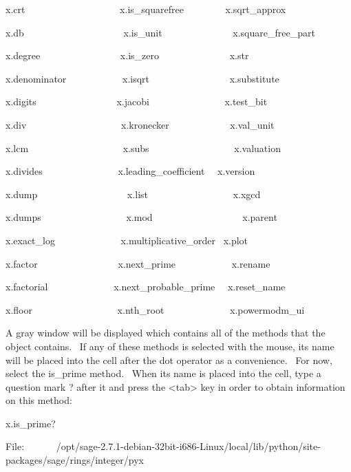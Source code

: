 \documentclass[12pt,twoside]{book}
\begin{document}
x.crt \ \ \ \ \ \ \ \ \ \ \ \ \ \ \ \ \ \ \ x.is\_squarefree
\ \ \ \ \ \ \ \ x.sqrt\_approx

x.db \ \ \ \ \ \ \ \ \ \ \ \ \ \ \ \ \ \ \ \ x.is\_unit
\ \ \ \ \ \ \ \ \ \ \ \ \ \ x.square\_free\_part

x.degree \ \ \ \ \ \ \ \ \ \ \ \ \ \ \ \ x.is\_zero
\ \ \ \ \ \ \ \ \ \ \ \ \ \ x.str

x.denominator \ \ \ \ \ \ \ \ \ \ \ x.isqrt
\ \ \ \ \ \ \ \ \ \ \ \ \ \ \ \ x.substitute

x.digits \ \ \ \ \ \ \ \ \ \ \ \ \ \ \ \ x.jacobi
\ \ \ \ \ \ \ \ \ \ \ \ \ \ \ x.test\_bit

x.div \ \ \ \ \ \ \ \ \ \ \ \ \ \ \ \ \ \ \ x.kronecker
\ \ \ \ \ \ \ \ \ \ \ \ x.val\_unit

x.lcm \ \ \ \ \ \ \ \ \ \ \ \ \ \ \ \ \ \ \ x.subs
\ \ \ \ \ \ \ \ \ \ \ \ \ \ \ \ \ x.valuation

x.divides \ \ \ \ \ \ \ \ \ \ \ \ \ \ \ x.leading\_coefficient
\ \ x.version

x.dump \ \ \ \ \ \ \ \ \ \ \ \ \ \ \ \ \ \ x.list
\ \ \ \ \ \ \ \ \ \ \ \ \ \ \ \ \ x.xgcd

x.dumps \ \ \ \ \ \ \ \ \ \ \ \ \ \ \ \ \ x.mod
\ \ \ \ \ \ \ \ \ \ \ \ \ \ \ \ \ \ x.parent

x.exact\_log \ \ \ \ \ \ \ \ \ \ \ \ \ x.multiplicative\_order \ x.plot

x.factor \ \ \ \ \ \ \ \ \ \ \ \ \ \ \ \ x.next\_prime
\ \ \ \ \ \ \ \ \ \ \ x.rename

x.factorial \ \ \ \ \ \ \ \ \ \ \ \ \ x.next\_probable\_prime
\ \ x.reset\_name

x.floor \ \ \ \ \ \ \ \ \ \ \ \ \ \ \ \ \ x.nth\_root
\ \ \ \ \ \ \ \ \ \ \ \ \ x.powermodm\_ui


\bigskip

A gray window will be displayed which contains all of the methods that the object contains. \ If any of these methods is selected with the mouse, its name will be placed into the cell after the dot operator as a convenience. \ For now, select the is\_prime method. \ When its name is placed into the cell, type a question mark {\textquotesingle}?{\textquotesingle} after it and press the {\textless}tab{\textgreater} key in order to obtain information on this method: 

\bigskip

x.is\_prime?

{\textbar}

File:
\ \ \ \ \ \ /opt/sage{}-2.7.1{}-debian{}-32bit{}-i686{}-Linux/local/lib/python/site{}-packages/sage/rings/integer/pyx
\end{document}
